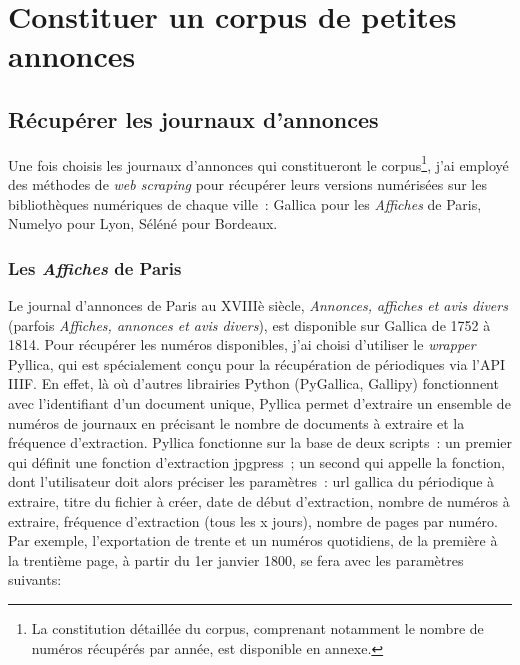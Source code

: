 \part{Constituer un corpus de petites annonces}



\chapter{Récupérer les journaux d'annonces}

Une fois choisis les journaux d’annonces qui constitueront le corpus\footnote{La constitution détaillée du corpus, comprenant notamment le nombre de numéros récupérés par année, est disponible en annexe.}, j’ai employé des méthodes de \textit{web scraping} pour récupérer leurs versions numérisées sur les bibliothèques numériques de chaque ville : Gallica pour les \textit{Affiches} de Paris, Numelyo pour Lyon, Séléné pour Bordeaux. 

\section{Les \textit{Affiches} de Paris}

Le journal d’annonces de Paris au XVIIIè siècle,\textit{ Annonces, affiches et avis divers} (parfois\textit{ Affiches, annonces et avis divers}), est disponible sur Gallica de 1752 à 1814. Pour récupérer les numéros disponibles, j’ai choisi d’utiliser le \textit{wrapper} Pyllica, qui est spécialement conçu pour la récupération de périodiques via l’API IIIF. En effet, là où d’autres librairies Python (PyGallica, Gallipy) fonctionnent avec l’identifiant d’un document unique, Pyllica permet d’extraire un ensemble de numéros de journaux en précisant le nombre de documents à extraire et la fréquence d’extraction. Pyllica fonctionne sur la base de deux scripts : un premier qui définit une fonction d’extraction jpgpress ; un second qui appelle la fonction, dont l’utilisateur doit alors préciser les paramètres : url gallica du périodique à extraire, titre du fichier à créer, date de début d’extraction, nombre de numéros à extraire, fréquence d’extraction (tous les x jours), nombre de pages par numéro. Par exemple, l'exportation de trente et un numéros quotidiens, de la première à la trentième page, à partir du 1er janvier 1800, se fera avec les paramètres suivants:

\bigskip





